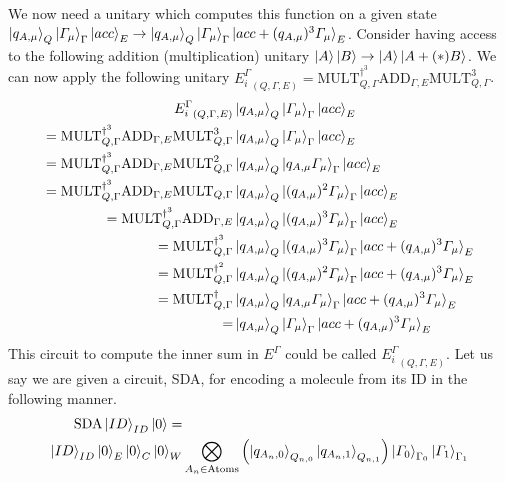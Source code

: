\documentclass{article}
\begin{document}
We now need a unitary which computes this function on a given state $\ket{q_{A,\mu}}_Q\ket{\varGamma_\mu}_\Gamma\ket{acc}_E \to \ket{q_{A,\mu}}_Q\ket{\varGamma_\mu}_\Gamma\ket{acc+(q_{A,\mu})^3\varGamma_{\mu}}_E$. 
Consider having access to the following addition (multiplication) unitary $\ket{A}\ket{B} \to \ket{A}\ket{A+(*)B}$. 
We can now apply the following unitary ${E_i^\Gamma}_{(Q,\Gamma,E)} = \text{MULT}^{\dagger^3}_{Q,\Gamma}\text{ADD}_{\Gamma,E}\text{MULT}^{3}_{Q,\Gamma}$.  
\begin{align}
    {E_i^\Gamma}_{(Q,\Gamma,E)}&\ket{q_{A,\mu}}_Q\ket{\varGamma_\mu}_\Gamma\ket{acc}_E\\
    =\text{MULT}^{\dagger^3}_{Q,\Gamma}\text{ADD}_{\Gamma,E}\text{MULT}^{3}_{Q,\Gamma}&\ket{q_{A,\mu}}_Q\ket{\varGamma_\mu}_\Gamma\ket{acc}_E\\ 
    = \text{MULT}^{\dagger^3}_{Q,\Gamma}\text{ADD}_{\Gamma,E}\text{MULT}^{2}_{Q,\Gamma}&\ket{q_{A,\mu}}_Q\ket{q_{A,\mu}\varGamma_\mu}_\Gamma\ket{acc}_E\\
    = \text{MULT}^{\dagger^3}_{Q,\Gamma}\text{ADD}_{\Gamma,E}\text{MULT}_{Q,\Gamma}&\ket{q_{A,\mu}}_Q\ket{(q_{A,\mu})^2\varGamma_\mu}_\Gamma\ket{acc}_E\\
    = \text{MULT}^{\dagger^3}_{Q,\Gamma}\text{ADD}_{\Gamma,E}&\ket{q_{A,\mu}}_Q\ket{(q_{A,\mu})^3\varGamma_\mu}_\Gamma\ket{acc}_E\\
    = \text{MULT}^{\dagger^3}_{Q,\Gamma}&\ket{q_{A,\mu}}_Q\ket{(q_{A,\mu})^3\varGamma_\mu}_\Gamma\ket{acc+(q_{A,\mu})^3\varGamma_\mu}_E\\
    = \text{MULT}^{\dagger^2}_{Q,\Gamma}&\ket{q_{A,\mu}}_Q\ket{(q_{A,\mu})^2\varGamma_\mu}_\Gamma\ket{acc+(q_{A,\mu})^3\varGamma_\mu}_E\\
    = \text{MULT}^{\dagger}_{Q,\Gamma}&\ket{q_{A,\mu}}_Q\ket{q_{A,\mu}\varGamma_\mu}_\Gamma\ket{acc+(q_{A,\mu})^3\varGamma_\mu}_E\\
    = &\ket{q_{A,\mu}}_Q\ket{\varGamma_\mu}_\Gamma\ket{acc+(q_{A,\mu})^3\varGamma_\mu}_E\\
\end{align}
This circuit to compute the inner sum in $E^\Gamma$ could be called ${E_i^\Gamma}_{(Q,\Gamma,E)}$. Let us say we are given a circuit, SDA, for encoding a molecule from its ID in the following manner. 
\begin{equation}
\begin{split}
    \text{SDA}\ket{ID}_{ID}\ket{0}=&\\
    \ket{ID}_{ID}\ket{0}_E\ket{0}_C\ket{0}_W&\bigotimes_{A_n\in \text{Atoms}}\left(\ket{q_{A_n,0}}_{Q_{n,0}}\ket{q_{A_n,1}}_{Q_{n,1}}\right)\ket{\varGamma_0}_{\Gamma_0}\ket{\varGamma_1}_{\Gamma_1} 
\end{split}
\end{equation}
\end{document}

